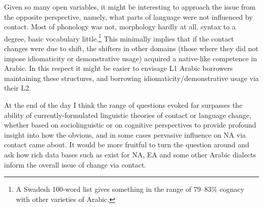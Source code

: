 \documentclass[output=paper]{langsci/langscibook}
\begin{document}
Given so many open variables, it might be interesting to approach the issue from the opposite perspective, namely, what parts of language were not influenced by contact. Most of phonology was not, morphology hardly at all, syntax to a degree, basic vocabulary little.\footnote{A Swadesh 100-word list gives something in the range of 79–83\% cognacy with   other varieties of Arabic.} This minimally implies that if the contact changes were due to shift, the shifters in other domains (those where they did not impose idiomaticity or demonstrative usage) acquired a native-like competence in Arabic. In this respect it might be easier to envisage L1 Arabic borrowers maintaining these structures, and borrowing idiomaticity/demonstrative usage via their L2. 

At the end of the day I think the range of questions evoked far surpasses the ability of currently-formulated linguistic theories of contact or language change, whether based on sociolinguistic or on cognitive perspectives \citep[523]{Lucas2015} to provide profound insight into how the obvious, and in some cases pervasive influence on NA via contact came about. It would be more fruitful to turn the question around and ask how rich data bases such as exist for NA, EA and some other Arabic dialects inform the overall issue of change via contact. 
\end{document}
